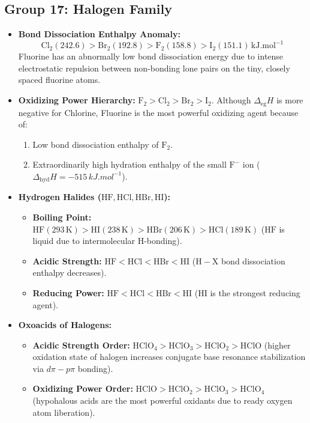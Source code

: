 \documentclass[10pt,twoside,openright]{book}
\begin{document}
\subsection{Group 17: Halogen Family}
\begin{itemize}
  \item \textbf{Bond Dissociation Enthalpy Anomaly:}
  \begin{equation}
    \mathbf{\mathrm{Cl_2 (242.6) > Br_2 (192.8) > F_2 (158.8) > I_2 (151.1)\,\si{kJ.mol^{-1}}}}
  \end{equation}
  Fluorine has an abnormally low bond dissociation energy due to intense electrostatic repulsion between non-bonding lone pairs on the tiny, closely spaced fluorine atoms.
  \item \textbf{Oxidizing Power Hierarchy:} $\mathbf{\mathrm{F_2 > Cl_2 > Br_2 > I_2}}$.
  Although $\Delta_{\text{eg}} H$ is more negative for Chlorine, Fluorine is the most powerful oxidizing agent because of:
  \begin{enumerate}
    \item Low bond dissociation enthalpy of $\mathrm{F_2}$.
    \item Extraordinarily high hydration enthalpy of the small $\mathrm{F^-}$ ion ($\Delta_{\text{hyd}} H = -515\,\si{kJ.mol^{-1}}$).
  \end{enumerate}
  \item \textbf{Hydrogen Halides ($\mathrm{HF, HCl, HBr, HI}$):}
  \begin{itemize}
    \item \textbf{Boiling Point:} $\mathbf{\mathrm{HF (293\,K) > HI (238\,K) > HBr (206\,K) > HCl (189\,K)}}$ ($\mathrm{HF}$ is liquid due to intermolecular H-bonding).
    \item \textbf{Acidic Strength:} $\mathrm{HF < HCl < HBr < HI}$ ($\mathrm{H-X}$ bond dissociation enthalpy decreases).
    \item \textbf{Reducing Power:} $\mathrm{HF < HCl < HBr < HI}$ ($\mathrm{HI}$ is the strongest reducing agent).
  \end{itemize}
  \item \textbf{Oxoacids of Halogens:}
  \begin{itemize}
    \item \textbf{Acidic Strength Order:} $\mathbf{\mathrm{HClO_4 > HClO_3 > HClO_2 > HClO}}$ (higher oxidation state of halogen increases conjugate base resonance stabilization via $d\pi-p\pi$ bonding).
    \item \textbf{Oxidizing Power Order:} $\mathbf{\mathrm{HClO > HClO_2 > HClO_3 > HClO_4}}$ (hypohalous acids are the most powerful oxidants due to ready oxygen atom liberation).
  \end{itemize}
\end{itemize}
\end{document}
